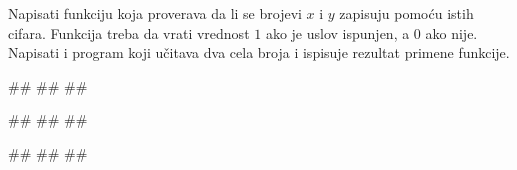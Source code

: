 \begin{Exercise}[label=p1.4_12] 
Napisati funkciju  koja proverava da li
se brojevi $x$ i $y$ zapisuju pomoću istih cifara. Funkcija treba da
vrati vrednost $1$ ako je uslov ispunjen, a $0$ ako nije. Napisati i
program koji učitava dva cela broja i ispisuje rezultat primene
funkcije.
 
\begin{miditest}
\begin{upotreba}{1}
#\naslovInt#
##
##
\end{upotreba}
\end{miditest}
\begin{miditest}
\begin{upotreba}{2}
#\naslovInt#
##
##
\end{upotreba}
\end{miditest}

\begin{miditest}
\begin{upotreba}{3}
#\naslovInt#
##
##
\end{upotreba}
\end{miditest} 

\end{Exercise}
\ifresenja 
\begin{Answer}[ref=p1.4_12]
\end{Answer} 
\fi


